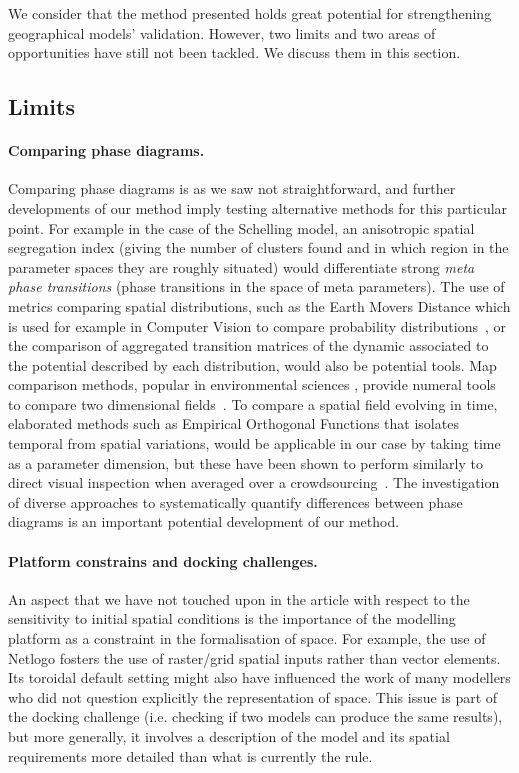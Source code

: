 \documentclass[Royal,sageh,times]{sagej}
\begin{document}
We consider that the method presented holds great potential for strengthening geographical models' validation. However, two limits and two areas of opportunities have still not been tackled. We discuss them in this section.

\subsection{Limits}

\paragraph{Comparing phase diagrams.} Comparing phase diagrams is as we saw not straightforward, and further developments of our method imply testing alternative methods for this particular point. For example in the case of the Schelling model, an anisotropic spatial segregation index (giving the number of clusters found and in which region in the parameter spaces they are roughly situated) would differentiate strong \emph{meta phase transitions} (phase transitions in the space of meta parameters). The use of metrics comparing spatial distributions, such as the Earth Movers Distance which is used for example in Computer Vision to compare probability distributions~\cite{rubner2000earth}, or the comparison of aggregated transition matrices of the dynamic associated to the potential described by each distribution, would also be potential tools. Map comparison methods, popular in environmental sciences %
, provide numeral tools to compare two dimensional fields~\cite{visser2006map}. To compare a spatial field evolving in time, elaborated methods such as Empirical Orthogonal Functions that isolates temporal from spatial variations, would be applicable in our case by taking time as a parameter dimension, but these have been shown to perform similarly to direct visual inspection when averaged over a crowdsourcing~\cite{10.1371/journal.pone.0178165}. The investigation of diverse approaches to systematically quantify differences between phase diagrams is an important potential development of our method.


\paragraph{Platform constrains and docking challenges.} An aspect that we have not touched upon in the article with respect to the sensitivity to initial spatial conditions is the importance of the modelling platform as a constraint in the formalisation of space. For example, the use of Netlogo fosters the use of raster/grid spatial inputs rather than vector elements. Its toroidal default setting might also have influenced the work of many modellers who did not question explicitly the representation of space. This issue is part of the docking challenge \citep{Axtelletal1996} (i.e. checking if two models can produce the same results), but more generally, it involves a description of the model and its spatial requirements more detailed than what is currently the rule.
\end{document}
